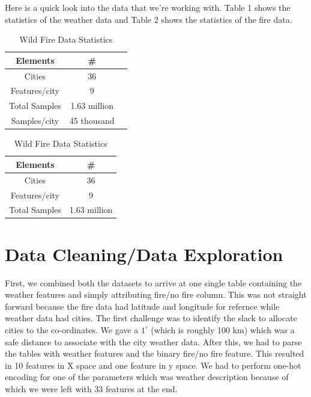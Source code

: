 \documentclass[10pt]{article}
\begin{document}
Here is a quick look into the data that we're working with. Table 1 shows the
statistics of the weather data and Table 2 shows the statistics of the fire
data.\par

\begin{table}[H]
    \centering
    \begin{minipage}[t]{0.45\textwidth}
        \caption{Weather Data Statistics}
        \centering
        \begin{tabular}{c c c}
            \hline
            Elements & \# \\ %
            \hline
                Cities & 36 \\
                Features/city & 9 \\
                Total Samples & 1.63 million \\
                Samples/city & 45 thousand 
                
        \end{tabular}
    \end{minipage}
    \begin{minipage}[t]{0.45\textwidth}
        \caption{Wild Fire Data Statistics}
        \centering
        \begin{tabular}{c c}
            \hline
            Elements & \# \\ %
            \hline
            Cities & 36 \\
            Features/city & 9 \\
            Total Samples & 1.63 million\\
        \end{tabular}
    \end{minipage}
\end{table}
\section{Data Cleaning/Data Exploration}
First, we combined both the datasets to arrive at one single table containing
the weather features and simply attributing fire/no fire column. This was not
straight forward because the fire data had latitude and longitude for refernce
while weather data had cities. The first challenge was to identify the slack to
allocate cities to the co-ordinates. We gave a $1^\circ$ (which is roughly
100 km) which was a safe distance to associate with the city weather data.
After this, we had to parse the tables with weather features and the binary
fire/no fire feature. This resulted in 10 features in X space and one feature
in y space. We had to perform one-hot encoding for one of the parameters which
was weather description because of which we were left with 33 features at the
end.\par
\end{document}
